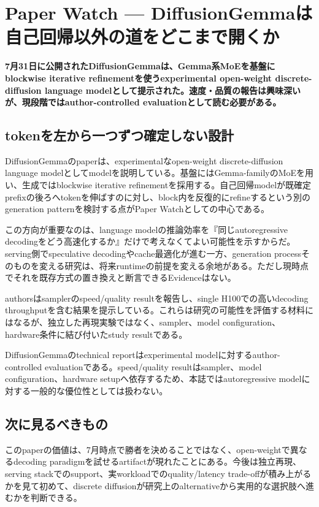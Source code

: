 \section{Paper Watch — DiffusionGemmaは自己回帰以外の道をどこまで開くか}
\label{pkg:paper-watch-july}
\noindent\textbf{7月31日に公開されたDiffusionGemmaは、Gemma系MoEを基盤にblockwise iterative refinementを使うexperimental open-weight discrete-diffusion language modelとして提示された。速度・品質の報告は興味深いが、現段階ではauthor-controlled evaluationとして読む必要がある。}\autocite{src-ab19992e4c80}

\subsection{tokenを左から一つずつ確定しない設計}

DiffusionGemmaのpaperは、experimentalなopen-weight discrete-diffusion language modelとしてmodelを説明している。基盤にはGemma-familyのMoEを用い、生成ではblockwise iterative refinementを採用する。自己回帰modelが既確定prefixの後ろへtokenを伸ばすのに対し、block内を反復的にrefineするという別のgeneration patternを検討する点がPaper Watchとしての中心である。\autocite{src-ab19992e4c80}


この方向が重要なのは、language modelの推論効率を『同じautoregressive decodingをどう高速化するか』だけで考えなくてよい可能性を示すからだ。serving側でspeculative decodingやcache最適化が進む一方、generation processそのものを変える研究は、将来runtimeの前提を変える余地がある。ただし現時点でそれを既存方式の置き換えと断言できるEvidenceはない。\autocite{src-ab19992e4c80}


authorsはsamplerのspeed/quality resultを報告し、single H100での高いdecoding throughputを含む結果を提示している。これらは研究の可能性を評価する材料にはなるが、独立した再現実験ではなく、sampler、model configuration、hardware条件に結び付いたstudy resultである。\autocite{src-ab19992e4c80}


\begin{claimboundary}
DiffusionGemmaのtechnical reportはexperimental modelに対するauthor-controlled evaluationである。speed/quality resultはsampler、model configuration、hardware setupへ依存するため、本誌ではautoregressive modelに対する一般的な優位性としては扱わない。\autocite{src-ab19992e4c80}
\end{claimboundary}

\subsection{次に見るべきもの}

このpaperの価値は、7月時点で勝者を決めることではなく、open-weightで異なるdecoding paradigmを試せるartifactが現れたことにある。今後は独立再現、serving stackでのsupport、実workloadでのquality/latency trade-offが積み上がるかを見て初めて、discrete diffusionが研究上のalternativeから実用的な選択肢へ進むかを判断できる。\autocite{src-ab19992e4c80}
